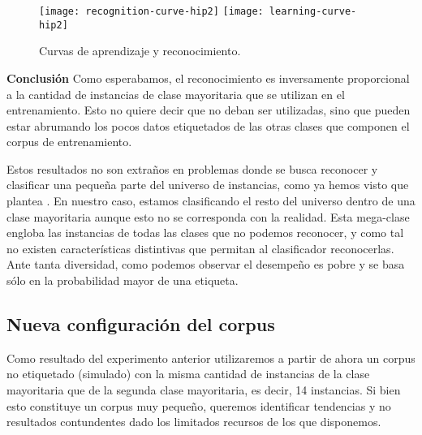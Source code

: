\begin{figure}[h!]\label{curva-apr-hip2}
\texttt{[image: recognition-curve-hip2]}
\texttt{[image: learning-curve-hip2]}
\caption{Curvas de aprendizaje y reconocimiento.}
\centering
\end{figure}

\vspace{3 mm}

\textbf{Conclusión}
Como esperabamos, el reconocimiento es inversamente proporcional a la cantidad de instancias de clase mayoritaria que se utilizan en el entrenamiento. Esto no quiere decir que no deban ser utilizadas, sino que pueden estar abrumando los pocos datos etiquetados de las otras clases que componen el corpus de entrenamiento.

Estos resultados no son extraños en problemas donde se busca reconocer y clasificar una pequeña parte del universo de instancias, como ya hemos visto que plantea \citet{rare-classes-holpedales}. En nuestro caso, estamos clasificando el resto del universo dentro de una clase mayoritaria aunque esto no se corresponda con la realidad. Esta mega-clase engloba las instancias de todas las clases que no podemos reconocer, y como tal no existen características distintivas que permitan al clasificador reconocerlas. Ante tanta diversidad, como podemos observar el desempeño es pobre y se basa sólo en la probabilidad mayor de una etiqueta.


\subsection{Nueva configuración del corpus}

Como resultado del experimento anterior utilizaremos a partir de ahora un corpus no etiquetado (simulado) con la misma cantidad de instancias de la clase mayoritaria que de la segunda clase mayoritaria, es decir, 14 instancias. Si bien esto constituye un corpus muy pequeño, queremos identificar tendencias y no resultados contundentes dado los limitados recursos de los que disponemos.

